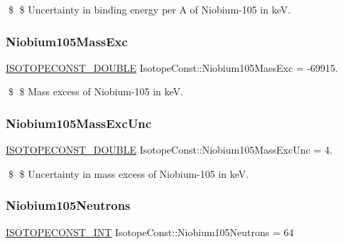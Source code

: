 \$ \$ Uncertainty in binding energy per A of Niobium-\/105 in keV. \mbox{\label{group___isotope_const-_niobium-_nb105_gafc245ae19910958cf9c54fa95f027ead}} 
\subsubsection{\texorpdfstring{Niobium105\+Mass\+Exc}{Niobium105MassExc}}
{\footnotesize\ttfamily \mbox{\hyperlink{group___isotope_const-_macros_ga8f45a7272ce02c0b4c65c44636ed719a}{I\+S\+O\+T\+O\+P\+E\+C\+O\+N\+S\+T\+\_\+\+D\+O\+U\+B\+LE}} Isotope\+Const\+::\+Niobium105\+Mass\+Exc = -\/69915.}

\$ \$ Mass excess of Niobium-\/105 in keV. \mbox{\label{group___isotope_const-_niobium-_nb105_gaf82eae1ac759bee013eb094252b4531d}} 
\subsubsection{\texorpdfstring{Niobium105\+Mass\+Exc\+Unc}{Niobium105MassExcUnc}}
{\footnotesize\ttfamily \mbox{\hyperlink{group___isotope_const-_macros_ga8f45a7272ce02c0b4c65c44636ed719a}{I\+S\+O\+T\+O\+P\+E\+C\+O\+N\+S\+T\+\_\+\+D\+O\+U\+B\+LE}} Isotope\+Const\+::\+Niobium105\+Mass\+Exc\+Unc = 4.}

\$ \$ Uncertainty in mass excess of Niobium-\/105 in keV. \mbox{\label{group___isotope_const-_niobium-_nb105_ga3caac8b6bc524e8340179c601ce8e671}} 
\subsubsection{\texorpdfstring{Niobium105\+Neutrons}{Niobium105Neutrons}}
{\footnotesize\ttfamily \mbox{\hyperlink{group___isotope_const-_macros_ga5f18360b3e99483a35c32d789e62621c}{I\+S\+O\+T\+O\+P\+E\+C\+O\+N\+S\+T\+\_\+\+I\+NT}} Isotope\+Const\+::\+Niobium105\+Neutrons = 64}

